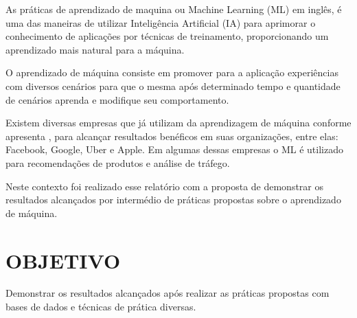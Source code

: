 As práticas de aprendizado de maquina ou Machine Learning (ML) em inglês, é uma das maneiras de utilizar Inteligência Artificial (IA) para aprimorar o conhecimento de aplicações por técnicas de treinamento, proporcionando um aprendizado mais natural para a máquina.

O aprendizado de máquina consiste em promover para a aplicação experiências com diversos cenários para que o mesma após determinado tempo e quantidade de cenários aprenda e modifique seu comportamento.

Existem diversas empresas que já utilizam da aprendizagem de máquina conforme apresenta \cite{ray:2019}, para alcançar resultados benéficos em suas organizações, entre elas: Facebook, Google, Uber e Apple. Em algumas dessas empresas o ML é utilizado para recomendações de produtos e análise de tráfego.

Neste contexto foi realizado esse relatório com a proposta de demonstrar os resultados alcançados por intermédio de práticas propostas sobre o aprendizado de máquina.
\section{OBJETIVO}
Demonstrar os resultados alcançados após realizar as práticas propostas com bases de dados e técnicas de prática diversas.